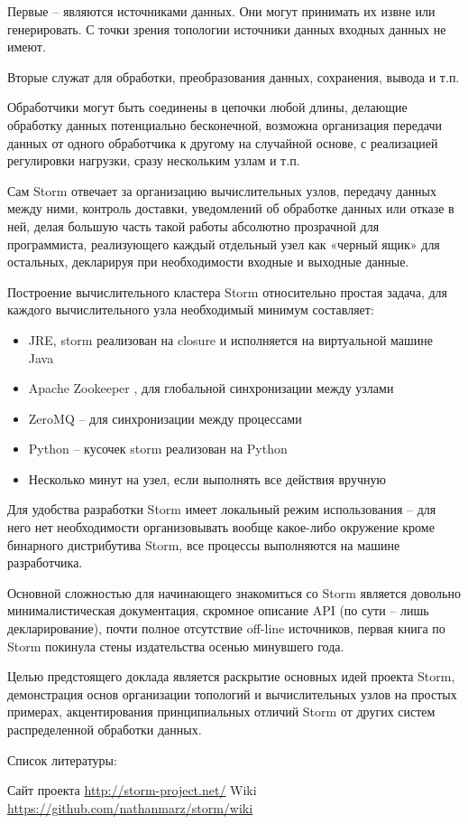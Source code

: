 \documentclass[10pt, a5paper]{article}
\begin{document}
Первые – являются источниками данных. Они могут принимать их извне или генерировать. С точки зрения топологии источники данных входных данных не имеют.

Вторые служат для обработки, преобразования данных, сохранения, вывода и т.п.

Обработчики могут быть соединены в цепочки любой длины, делающие обработку данных потенциально бесконечной, возможна организация передачи данных от одного обработчика к другому на случайной основе, с реализацией регулировки нагрузки, сразу нескольким узлам и т.п.

Сам Storm отвечает за  организацию вычислительных узлов, передачу данных между ними, контроль доставки, уведомлений об обработке данных или отказе в ней, делая большую часть такой работы абсолютно прозрачной для программиста, реализующего каждый отдельный узел как «черный ящик» для остальных, декларируя при необходимости входные и выходные данные.

Построение вычислительного кластера Storm относительно простая задача, для каждого вычислительного узла необходимый минимум составляет: 
\begin{itemize}
\item JRE, storm реализован на closure и исполняется на виртуальной машине Java
\item Apache Zookeeper , для глобальной синхронизации между узлами
\item ZeroMQ  -- для синхронизации между процессами
\item Python – кусочек storm реализован на Python
\item Несколько минут на узел, если выполнять все действия вручную
\end{itemize}


Для удобства разработки Storm имеет локальный режим использования – для него нет необходимости организовывать вообще какое-либо окружение кроме бинарного дистрибутива Storm, все процессы выполняются на машине разработчика.

Основной сложностью для начинающего знакомиться со Storm является довольно минималистическая документация, скромное описание API (по сути – лишь декларирование), почти полное отсутствие off-line источников, первая книга по Storm покинула стены издательства осенью минувшего года.

Целью предстоящего доклада является раскрытие основных идей проекта Storm,  демонстрация основ организации топологий и вычислительных узлов на простых примерах, акцентирования принципиальных отличий Storm от других систем распределенной обработки данных.

Список литературы:

\begin{thebibliography}{9}
 Сайт проекта \url{http://storm-project.net/}
 Wiki \url{https://github.com/nathanmarz/storm/wiki}
\end{thebibliography}
\end{document}
